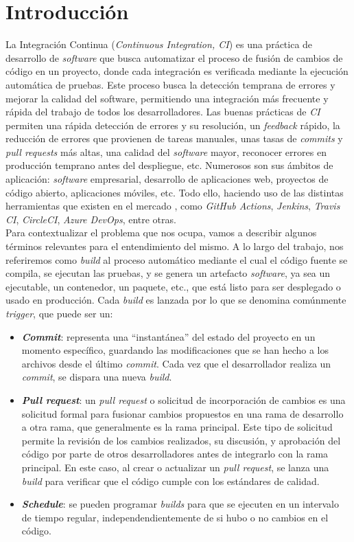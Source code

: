 \section{Introducción}
La Integración Continua (\textit{Continuous Integration, CI}) es una práctica de desarrollo de
\textit{software} que busca automatizar el proceso de fusión de cambios de código en un proyecto,
donde cada integración es verificada mediante la ejecución automática de pruebas. Este proceso
busca la detección temprana de errores y mejorar la calidad del software, permitiendo una
integración más frecuente y rápida del trabajo de todos los desarrolladores. Las buenas prácticas
de \textit{CI} \cite{8} permiten una rápida detección de errores y su resolución, un
\textit{feedback} rápido, la reducción de errores que provienen de tareas manuales, unas tasas de
\textit{commits} y \textit{pull requests} más altas, una calidad del \textit{software} mayor,
reconocer errores en producción temprano antes del despliegue, etc. Numerosos son sus ámbitos
de aplicación: \textit{software} empresarial, desarrollo de aplicaciones web, proyectos de código
abierto, aplicaciones móviles, etc. Todo ello, haciendo uso de las distintas herramientas que
existen en el mercado \cite{9}, como \textit{GitHub Actions}, \textit{Jenkins},
\textit{Travis CI}, \textit{CircleCI}, \textit{Azure DevOps}, entre otras.\\

Para contextualizar el problema que nos ocupa, vamos a describir algunos términos relevantes para
el entendimiento del mismo. A lo largo del trabajo, nos referiremos como \textit{build} al 
proceso automático mediante el cual el código fuente se compila, se ejecutan las pruebas, y se
genera un artefacto \textit{software}, ya sea un ejecutable, un contenedor, un paquete, etc., que
está listo para ser desplegado o usado en producción. Cada \textit{build} es lanzada por lo
que se denomina comúnmente \textit{trigger}, que puede ser un:
\begin{itemize}
    \item \textbf{\textit{Commit}}: representa una ``instantánea'' del estado del proyecto en 
    un momento específico, guardando las modificaciones que se han hecho a los archivos desde el
    último \textit{commit}. Cada vez que el desarrollador realiza un \textit{commit}, se dispara
    una nueva \textit{build}.
    \item \textbf{\textit{Pull request}}: un \textit{pull request} o solicitud de incorporación
    de cambios es una solicitud formal para fusionar cambios propuestos en una rama de desarrollo
    a otra rama, que generalmente es la rama principal. Este tipo de solicitud permite la
    revisión de los cambios realizados, su discusión, y aprobación del código por parte de
    otros desarrolladores antes de integrarlo con la rama principal. En este caso, al crear o
    actualizar un \textit{pull request}, se lanza una \textit{build} para verificar que el código
    cumple con los estándares de calidad.
    \item \textbf{\textit{Schedule}}: se pueden programar \textit{builds} para que se ejecuten
    en un intervalo de tiempo regular, independendientemente de si hubo o no cambios en el código.
\end{itemize}

